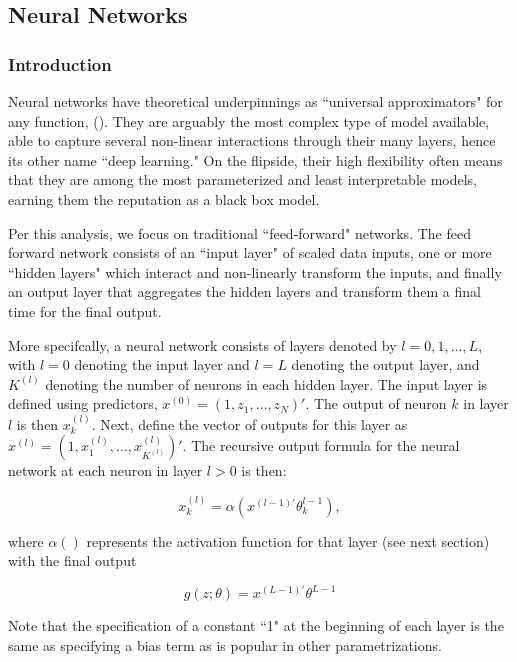 \documentclass[a4paper, table]{article}
\begin{document}
\pagebreak

\subsection{Neural Networks}

\subsubsection{Introduction}

Neural networks have theoretical underpinnings as ``universal approximators" for any function, (\cite{hornik_multilayer_1989}). They are arguably the most complex type of model available, able to capture several non-linear interactions through their many layers, hence its other name ``deep learning."  On the flipside, their high flexibility often means that they are among the most parameterized and least interpretable models, earning them the reputation as a black box model.

Per this analysis, we focus on traditional ``feed-forward" networks. The feed forward network consists of an ``input layer" of scaled data inputs, one or more ``hidden layers" which interact and non-linearly transform the inputs, and finally an output layer that aggregates the hidden layers and transform them a final time for the final output. 

More specifcally, a neural network consists of layers denoted by $l = 0, 1, \dots, L$, with $l = 0$ denoting the input layer and $l = L$ denoting the output layer, and $K^{(l)}$ denoting the number of neurons in each hidden layer. The input layer is defined using predictors, $x^{(0)} = (1, z_1, \dots, z_N)'$. The output of neuron $k$ in layer $l$ is then $x_k^{(l)}$. Next, define the vector of outputs for this layer as $x^{(l)} = (1, x_1^{(l)}, \dots, x_{K^(l)}^{(l)})'$.  The recursive output formula for the neural network at each neuron in layer $l > 0$ is then:

\begin{equation}
x_k^{(l)} = \alpha(x^{(l-1)'}\theta_k^{l-1}),
\end{equation}

where $\alpha()$ represents the activation function for that layer (see next section) with the final output

\begin{equation}
g(z;\theta) = x^{(L-1)'}\theta^{L-1}
\end{equation}

Note that the specification of a constant ``1" at the beginning of each layer is the same as specifying a bias term as is popular in other parametrizations. 
\end{document}
